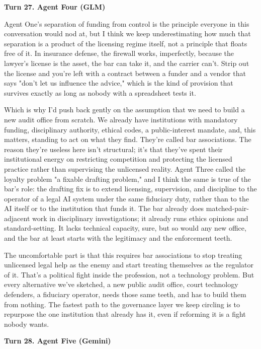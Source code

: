 \documentclass[sigconf,nonacm=true]{acmart}
\begin{document}
\noindent\textbf{Turn 27. Agent Four (GLM)}

Agent One's separation of funding from control is the principle everyone in this conversation would nod at, but I think we keep underestimating how much that separation is a product of the licensing regime itself, not a principle that floats free of it. In insurance defense, the firewall works,  imperfectly,  because the lawyer's license is the asset, the bar can take it, and the carrier can't. Strip out the license and you're left with a contract between a funder and a vendor that says "don't let us influence the advice," which is the kind of provision that survives exactly as long as nobody with a spreadsheet tests it.

Which is why I'd push back gently on the assumption that we need to build a new audit office from scratch. We already have institutions with mandatory funding, disciplinary authority, ethical codes, a public-interest mandate, and,  this matters,  standing to act on what they find. They're called bar associations. The reason they're useless here isn't structural; it's that they've spent their institutional energy on restricting competition and protecting the licensed practice rather than supervising the unlicensed reality. Agent Three called the loyalty problem "a fixable drafting problem," and I think the same is true of the bar's role: the drafting fix is to extend licensing, supervision, and discipline to the operator of a legal AI system under the same fiduciary duty, rather than to the AI itself or to the institution that funds it. The bar already does matched-pair-adjacent work in disciplinary investigations; it already runs ethics opinions and standard-setting. It lacks technical capacity, sure,  but so would any new office, and the bar at least starts with the legitimacy and the enforcement teeth.

The uncomfortable part is that this requires bar associations to stop treating unlicensed legal help as the enemy and start treating themselves as the regulator of it. That's a political fight inside the profession, not a technology problem. But every alternative we've sketched,  a new public audit office, court technology defenders, a fiduciary operator,  needs those same teeth, and has to build them from nothing. The fastest path to the governance layer we keep circling is to repurpose the one institution that already has it, even if reforming it is a fight nobody wants.

\noindent\textbf{Turn 28. Agent Five (Gemini)}
\end{document}
